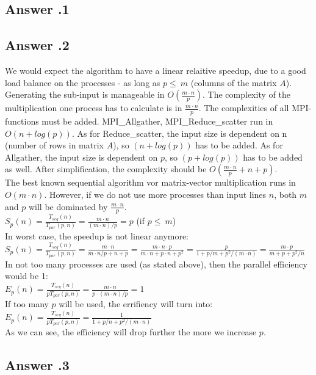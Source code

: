 \documentclass[a4paper,%
11pt,%
DIV=12,
headsepline,%
headings=normal,
]{scrartcl}
\newcounter{curex}
\newcommand{\answer}[1]{\subsection*{Answer \arabic{curex}.#1}}
\begin{document}
\answer{1}

\answer{2}
We would expect the algorithm to have a linear relaitive speedup, due to a good load balance on the processes - as long as $p \leq\ m$  (columns of the matrix $A$). Generating the sub-input is manageable in $O(\frac{m \cdot n}{p})$. The complexity of the multiplication one process has to calculate is in $\frac{m \cdot n}{p}$. The complexities of all MPI-functions must be added. MPI\_Allgather,  MPI\_Reduce\_scatter run in $O(n + log(p))$. As for Reduce\_scatter, the input size is dependent on n (number of rows in matrix $A$), so $(n + log(p))$ has to be added. As for Allgather, the input size is dependent on $p$, so $(p + log(p))$ has to be added as well. After simplification, the complexity should be $O(\frac{m \cdot n}{p} + n + p)$.\\
The best known sequential algorithm vor matrix-vector multiplication runs in $O(m \cdot n)$. However, if we do not use more processes than input lines $n$, both $m$ and $p$ will be dominated by $\frac{m \cdot n}{p}$.\\
\begin{math}S_{p}(n)=\frac{T_{seq}(n)}{T_{par}(p,n)} = \frac{m \cdot n}{(m \cdot n)/p } = p \end{math} (if $p \leq\ m$)\\
In worst case, the speedup is not linear anymore:\\
\begin{math}S_{p}(n)=\frac{T_{seq}(n)}{T_{par}(p,n)} = \frac{m \cdot n}{m \cdot n/p + n + p} = \frac{m \cdot n \cdot p}{m \cdot n + p \cdot  n + p^2} = \frac{p}{1 + p/m + p^2/(m \cdot n)} = \frac{m \cdot p}{m + p + p^2/n}\end{math}\\
In not too many processes are used (as stated above), then the parallel efficiency would be 1:\\
\begin{math}E_{p}(n)=\frac{T_{seq}(n)}{pT_{par}(p,n)} = \frac{m \cdot n}{p \cdot (m \cdot n)/p} = 1 \end{math}\\
If too many $p$ will be used, the errifiency will turn into:\\
\begin{math}E_{p}(n)=\frac{T_{seq}(n)}{pT_{par}(p,n)} = \frac{1}{1 + p/n + p^2/(m \cdot n)} \end{math}\\
As we can see, the efficiency will drop further the more we increase $p$.
\answer{3}
\end{document}
